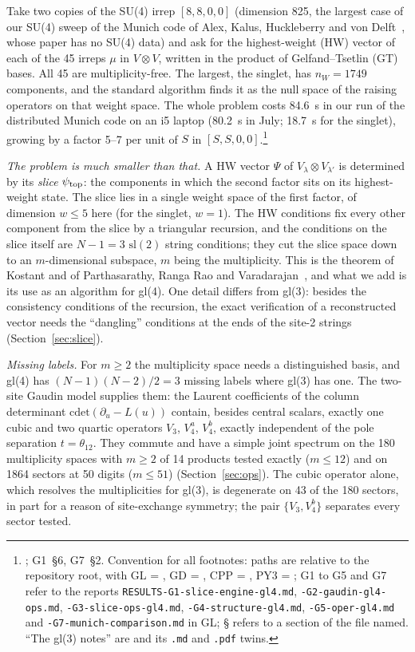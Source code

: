 \documentclass[11pt]{article}
\newcommand{\gd}[1]{\path{GD/#1}}
\newcommand{\cpp}[1]{\path{CPP/#1}}
\newcommand{\rg}[2]{\textsf{G#1}~\S#2}
\begin{document}
Take two copies of the SU(4) irrep $[8,8,0,0]$ (dimension 825, the largest case of our SU(4) sweep of the Munich code of Alex, Kalus, Huckleberry and von Delft~\cite{munich}, whose paper has no SU(4) data) and ask for the highest-weight (HW) vector of each of the 45 irreps $\mu$ in $V\otimes V$, written in the product of Gelfand--Tsetlin (GT) bases.
All 45 are multiplicity-free.
The largest, the singlet, has $n_W=1749$ components, and the standard algorithm finds it as the null space of the raising operators on that weight space.
The whole problem costs 84.6~s in our run of the distributed Munich code on an i5 laptop (80.2~s in July; 18.7~s for the singlet), growing by a factor 5--7 per unit of $S$ in $[S,S,0,0]$.\footnote{\cpp{results/hw_timings.txt}; \rg{1}{6}, \rg{7}{2}. Convention for all footnotes: paths are relative to the repository root, with GL = , GD = , CPP = , PY3 = ; G1 to G5 and G7 refer to the reports \texttt{RESULTS-G1-slice-engine-gl4.md}, \texttt{-G2-gaudin-gl4-ops.md}, \texttt{-G3-slice-ops-gl4.md}, \texttt{-G4-structure-gl4.md}, \texttt{-G5-oper-gl4.md} and \texttt{-G7-munich-comparison.md} in GL; \S{} refers to a section of the file named. ``The gl(3) notes'' are \gd{Slice-engine-notes.tex} and its \texttt{.md} and \texttt{.pdf} twins.}

\emph{The problem is much smaller than that.}
A HW vector $\Psi$ of $V_\lambda\otimes V_{\lambda'}$ is determined by its \emph{slice} $\psi_{\rm top}$: the components in which the second factor sits on its highest-weight state.
The slice lies in a single weight space of the first factor, of dimension $w\le5$ here (for the singlet, $w=1$).
The HW conditions fix every other component from the slice by a triangular recursion, and the conditions on the slice itself are $N-1=3$ $\mathrm{sl}(2)$ string conditions; they cut the slice space down to an $m$-dimensional subspace, $m$ being the multiplicity.
This is the theorem of Kostant and of Parthasarathy, Ranga Rao and Varadarajan~\cite{kostant,prv}, and what we add is its use as an algorithm for gl(4).
One detail differs from gl(3): besides the consistency conditions of the recursion, the exact verification of a reconstructed vector needs the ``dangling'' conditions at the ends of the site-2 strings (Section~\ref{sec:slice}).

\emph{Missing labels.}
For $m\ge2$ the multiplicity space needs a distinguished basis, and gl(4) has $(N-1)(N-2)/2=3$ missing labels where gl(3) has one.
The two-site Gaudin model supplies them: the Laurent coefficients of the column determinant $\mathrm{cdet}(\partial_u-L(u))$ contain, besides central scalars, exactly one cubic and two quartic operators $V_3$, $V_4^a$, $V_4^b$, exactly independent of the pole separation $t=\theta_{12}$.
They commute and have a simple joint spectrum on the 180 multiplicity spaces with $m\ge2$ of 14 products tested exactly ($m\le12$) and on 1864 sectors at 50 digits ($m\le51$) (Section~\ref{sec:ops}).
The cubic operator alone, which resolves the multiplicities for gl(3), is degenerate on 43 of the 180 sectors, in part for a reason of site-exchange symmetry; the pair $\{V_3,V_4^b\}$ separates every sector tested.
\end{document}
